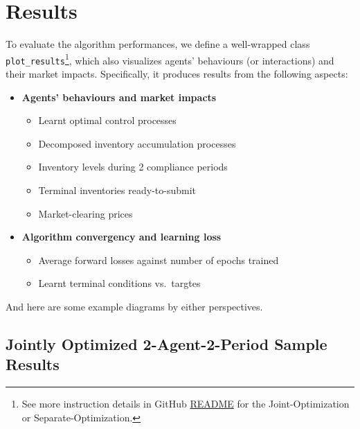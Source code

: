 \documentclass[a4paper,10pt]{article}
\newcommand{\1}{\mathbf{1}}
\begin{document}
\section{Results}\label{results}

To evaluate the algorithm performances, we define a
well-wrapped class \texttt{plot\_results}\footnote{See more instruction details in GitHub \href{https://github.com/OrangeAoo/PA-MFG-FBSDE/blob/3cffc5e8dbe09fbc880f6c2c70d76e0b6a1b8c3c/2Period/Joint_Optim_2Prdx1/README.md}{README} for the Joint-Optimization or Separate-Optimization.}, which also visualizes agents' behaviours (or interactions) and their market impacts. Specifically, it produces results from the following aspects:

\vspace{-0.5\topsep}

\begin{itemize}
  \setlength{\parskip}{0pt}
  \item\textbf{Agents' behaviours and market impacts}
    \begin{itemize}
      \tightlist
      \item Learnt optimal control processes
      \item Decomposed inventory accumulation processes
      \item Inventory levels during 2 compliance periods
      \item Terminal inventories ready-to-submit
      \item Market-clearing prices
    \end{itemize}
  \item\textbf{Algorithm convergency and learning loss}
      \begin{itemize}
        \tightlist
        \item Average forward losses against number of epochs trained
        \item Learnt terminal conditions vs.~targtes
      \end{itemize}
\end{itemize}

And here are some example diagrams by either perspectives.

\newpage  %


\subsection{Jointly Optimized 2-Agent-2-Period Sample Results}
\end{document}

